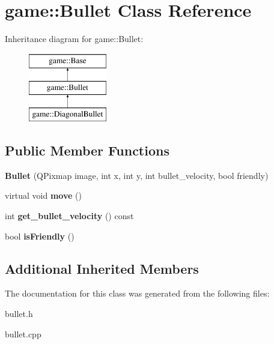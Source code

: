 \hypertarget{classgame_1_1Bullet}{}\section{game\+:\+:Bullet Class Reference}
\label{classgame_1_1Bullet}
Inheritance diagram for game\+:\+:Bullet\+:\begin{figure}[H]
\begin{center}
\leavevmode
\includegraphics[height=3.000000cm]{classgame_1_1Bullet}
\end{center}
\end{figure}
\subsection*{Public Member Functions}
\begin{DoxyCompactItemize}
\item 
\mbox{\label{classgame_1_1Bullet_a275416b258c5e576ad6b6a888808c378}} 
{\bfseries Bullet} (Q\+Pixmap image, int x, int y, int bullet\+\_\+velocity, bool friendly)
\item 
\mbox{\label{classgame_1_1Bullet_a194930eb9b7a2b49d6011bbd8ea90e93}} 
virtual void {\bfseries move} ()
\item 
\mbox{\label{classgame_1_1Bullet_a8837333b0e26ffa5164ada508227e602}} 
int {\bfseries get\+\_\+bullet\+\_\+velocity} () const
\item 
\mbox{\label{classgame_1_1Bullet_a64c7d33c678250d10c0a9e30134a3aea}} 
bool {\bfseries is\+Friendly} ()
\end{DoxyCompactItemize}
\subsection*{Additional Inherited Members}


The documentation for this class was generated from the following files\+:\begin{DoxyCompactItemize}
\item 
bullet.\+h\item 
bullet.\+cpp\end{DoxyCompactItemize}
